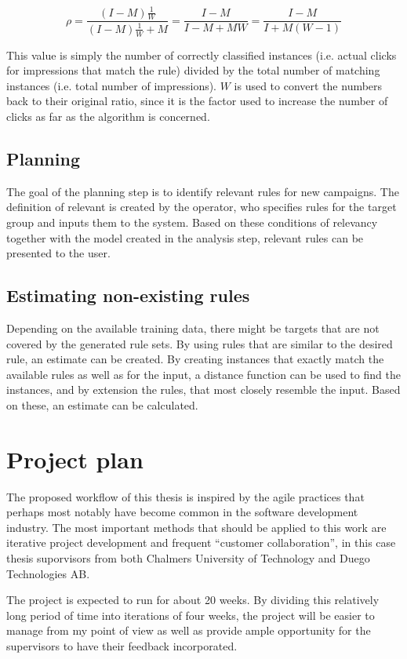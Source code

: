\documentclass[a4paper]{article}
\begin{document}
\[
	\rho = \frac{(I-M)\frac{1}{W}}{(I-M)\frac{1}{W}+M} = \frac{I-M}{I-M+MW} = \frac{I-M}{I+M(W-1)}
\]

This value is simply the number of correctly classified instances (i.e. actual clicks for impressions that match the rule) divided
by the total number of matching instances (i.e. total number of impressions). \(W\) is used to convert the numbers back to their
original ratio, since it is the factor used to increase the number of clicks as far as the algorithm is concerned.

\subsection{Planning}
The goal of the planning step is to identify relevant rules for new campaigns. The definition of relevant is created by the
operator, who specifies rules for the target group and inputs them to the system. Based on these conditions of relevancy together
with the model created in the analysis step, relevant rules can be presented to the user.

\subsection{Estimating non-existing rules}
Depending on the available training data, there might be targets that are not covered by the generated rule sets. By using rules
that are similar to the desired rule, an estimate can be created. By creating instances that exactly match the available rules as
well as for the input, a distance function can be used to find the instances, and by extension the rules, that most closely 
resemble the input. Based on these, an estimate can be calculated.

\section{Project plan}
The proposed workflow of this thesis is inspired by the agile practices that perhaps most notably have become common in the
software development industry. The most important methods that should be applied to this work are iterative project development
and frequent ``customer collaboration'', in this case thesis suporvisors from both Chalmers University of Technology and Duego
Technologies AB.

The project is expected to run for about 20 weeks. By dividing this relatively long period of time into iterations of four weeks,
the project will be easier to manage from my point of view as well as provide ample opportunity for the supervisors to have their
feedback incorporated.
\end{document}
